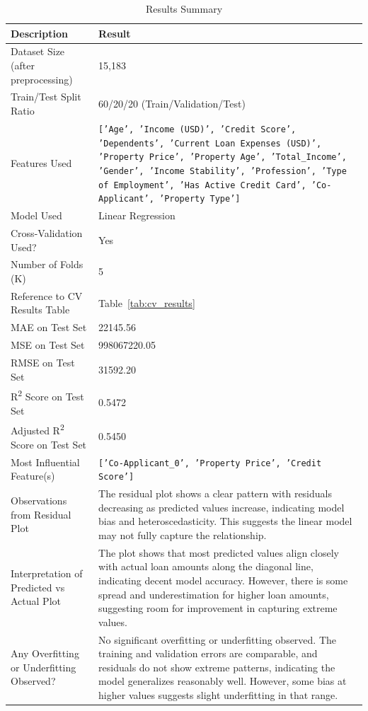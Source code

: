 \documentclass{article}
\begin{document}
\begin{longtable}{|p{5cm}|p{9cm}|}
\caption{Results Summary}
\label{tab:summary} \\
\hline
\textbf{Description} & \textbf{Result} \\
\hline
Dataset Size (after preprocessing) & 15,183 \\
\hline
Train/Test Split Ratio & 60/20/20 (Train/Validation/Test) \\
\hline
Features Used & 
\texttt{['Age', 'Income (USD)', 'Credit Score', 'Dependents', 'Current Loan Expenses (USD)', 'Property Price', 'Property Age', 'Total\_Income', 'Gender', 'Income Stability', 'Profession', 'Type of Employment', 'Has Active Credit Card', 'Co-Applicant', 'Property Type']} \\
\hline
Model Used & Linear Regression \\
\hline
Cross-Validation Used? & Yes \\
\hline
Number of Folds (K) & 5 \\
\hline
Reference to CV Results Table & Table~\ref{tab:cv_results} \\
\hline
MAE on Test Set & 22145.56 \\
\hline
MSE on Test Set & 998067220.05 \\
\hline
RMSE on Test Set & 31592.20 \\
\hline
R\textsuperscript{2} Score on Test Set & 0.5472 \\
\hline
Adjusted R\textsuperscript{2} Score on Test Set & 0.5450 \\
\hline
Most Influential Feature(s) & \texttt{['Co-Applicant\_0', 'Property Price', 'Credit Score']} \\
\hline
Observations from Residual Plot & The residual plot shows a clear pattern with residuals decreasing as predicted values increase, indicating model bias and heteroscedasticity. This suggests the linear model may not fully capture the relationship. \\
\hline
Interpretation of Predicted vs Actual Plot & The plot shows that most predicted values align closely with actual loan amounts along the diagonal line, indicating decent model accuracy. However, there is some spread and underestimation for higher loan amounts, suggesting room for improvement in capturing extreme values. \\
\hline
Any Overfitting or Underfitting Observed? & No significant overfitting or underfitting observed. The training and validation errors are comparable, and residuals do not show extreme patterns, indicating the model generalizes reasonably well. However, some bias at higher values suggests slight underfitting in that range. \\
\hline
\end{longtable}
\end{document}
